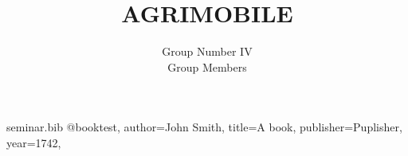 \RequirePackage{filecontents}
\begin{filecontents*}{seminar.bib}
@book{test,
author={John Smith},
title={A book},
publisher={Puplisher},
year={1742},
}
\end{filecontents*}
\documentclass{beamer}
\usepackage{graphicx}

\usepackage{latexsym}		%
\usepackage{epsfig}		%
\usepackage{rotating}		%
\usepackage{eufrak}
\usepackage{natbib}
\def\newblock{\hskip .11em plus .33em minus .07em}





%
%


{
  \usetheme{Madrid}

  \setbeamercovered{transparent}
}


\usepackage[english]{babel}

\usepackage[latin1]{inputenc}

\usepackage{times}
\usepackage[T1]{fontenc}


\title[AGRIMOBILE] %
{AGRIMOBILE}
%

\author[Group Number IV\\Group Members] %
{Group Number IV\\Group Members}

